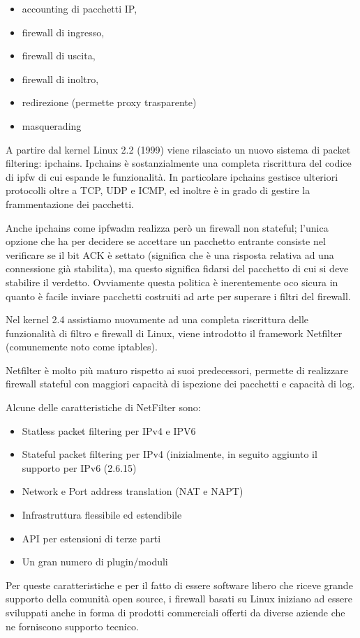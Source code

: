 \begin{itemize}
    \item accounting di pacchetti IP,
    \item firewall di ingresso,
    \item firewall di uscita,
    \item firewall di inoltro,
    \item redirezione (permette proxy trasparente)
    \item masquerading
\end{itemize}
A partire dal kernel Linux 2.2 (1999) viene rilasciato un nuovo sistema di packet
filtering: ipchains. Ipchains \`e sostanzialmente una completa
riscrittura del codice di ipfw di cui espande le funzionalità.  In particolare
ipchains gestisce ulteriori protocolli oltre a TCP, UDP e ICMP, ed inoltre è
in grado di gestire la frammentazione dei pacchetti.

Anche ipchains come ipfwadm realizza però un firewall non stateful; l'unica
opzione che ha per decidere se accettare un pacchetto entrante consiste nel
verificare se il bit ACK \`e settato (significa che è una risposta relativa ad
una connessione già stabilita), ma questo significa fidarsi del pacchetto di
cui si deve stabilire il verdetto.  Ovviamente questa politica è inerentemente
oco sicura in quanto è facile inviare pacchetti costruiti ad arte per
superare i filtri del firewall.

Nel kernel 2.4 assistiamo nuovamente ad una completa riscrittura delle
funzionalità di filtro e firewall di Linux, viene introdotto il framework 
Netfilter (comunemente noto come iptables).

Netfilter è molto più maturo rispetto ai suoi predecessori, permette di
realizzare firewall stateful con maggiori capacità di ispezione dei pacchetti
e capacità di log.

Alcune delle caratteristiche di NetFilter sono:

\begin{itemize}
    \item Statless packet filtering per IPv4 e IPV6
    \item Stateful packet filtering per IPv4 (inizialmente, in seguito
        aggiunto il supporto per IPv6 (2.6.15)
    \item Network e Port address translation (NAT e NAPT)
    \item Infrastruttura flessibile ed estendibile
    \item API per estensioni di terze parti
    \item Un gran numero di plugin/moduli
\end{itemize}
Per queste caratteristiche e per il fatto di essere software libero che riceve
grande supporto della comunità open source, i firewall basati su Linux
iniziano ad essere sviluppati anche in forma di prodotti commerciali offerti
da diverse aziende che ne forniscono supporto tecnico.

